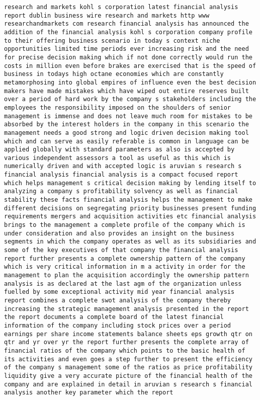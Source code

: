 \documentclass[11pt]{article}
\begin{document}
    \begin{Verbatim}[commandchars=\\\{\}]
research and markets kohl s corporation latest financial analysis report dublin business wire research and markets http www researchandmarkets com research financial analysis has announced the addition of the financial analysis kohl s corporation company profile to their offering business scenario in today s context niche opportunities limited time periods ever increasing risk and the need for precise decision making which if not done correctly would run the costs in million even before brakes are exercised that is the speed of business in todays high octane economies which are constantly metamorphosing into global empires of influence even the best decision makers have made mistakes which have wiped out entire reserves built over a period of hard work by the company s stakeholders including the employees the responsibility imposed on the shoulders of senior management is immense and does not leave much room for mistakes to be absorbed by the interest holders in the company in this scenario the management needs a good strong and logic driven decision making tool which and can serve as easily referable is common in language can be applied globally with standard parameters as also is accepted by various independent assessors a tool as useful as this which is numerically driven and with accepted logic is aruvian s research s financial analysis financial analysis is a compact focused report which helps management s critical decision making by lending itself to analyzing a company s profitability solvency as well as financial stability these facts financial analysis helps the management to make different decisions on segregating priority businesses present funding requirements mergers and acquisition activities etc financial analysis brings to the management a complete profile of the company which is under consideration and also provides an insight on the business segments in which the company operates as well as its subsidiaries and some of the key executives of that company the financial analysis report further presents a complete ownership pattern of the company which is very critical information in m a activity in order for the management to plan the acquisition accordingly the ownership pattern analysis is as declared at the last agm of the organization unless fuelled by some exceptional activity mid year financial analysis report combines a complete swot analysis of the company thereby increasing the strategic management analysis presented in the report the report documents a complete board of the latest financial information of the company including stock prices over a period earnings per share income statements balance sheets eps growth qtr on qtr and yr over yr the report further presents the complete array of financial ratios of the company which points to the basic health of its activities and even goes a step further to present the efficiency of the company s management some of the ratios as price profitability liquidity give a very accurate picture of the financial health of the company and are explained in detail in aruvian s research s financial analysis another key parameter which the report 
\end{Verbatim}
\end{document}
